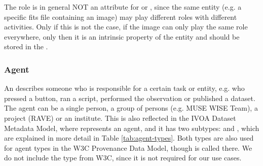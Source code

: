 The role is in general NOT an attribute for  or , 
since the same entity (e.g. a specific fits file containing an image) may play 
different roles with different activities. Only if this is not the case, if the 
image can only play the same role everywhere, only then it is an intrinsic 
property of the entity and should be stored in the .



%







\subsubsection{Agent}\label{sec:w3c-agent}

An  describes someone who is responsible for a certain task or
entity, e.g. who pressed a button, 
ran a script, performed the observation or published a dataset.
The agent can be a single person, a group of persons (e.g. MUSE WISE Team), a 
project (RAVE) or an institute. 
This is also reflected in the IVOA Dataset Metadata Model, where  
represents an agent, and it has two subtypes:  and ,
which are explained in more detail in Table \ref{tab:agent-types}.
Both types are also used for agent types in the W3C Provenance Data Model, though 
 is called  there. 
We do not include the type  from W3C, since it is not required for 
our use cases.


